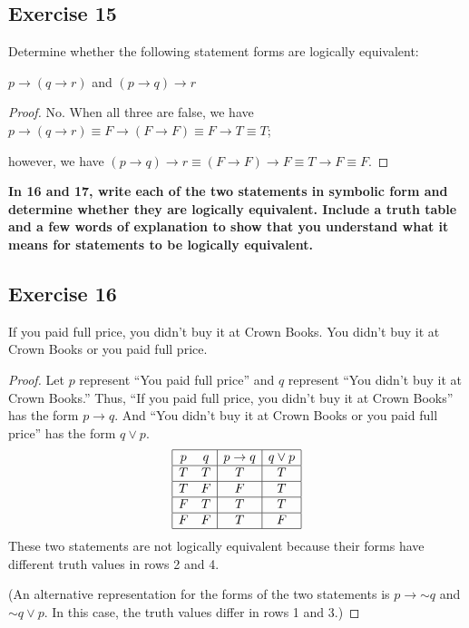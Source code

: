 \documentclass[14pt]{extarticle}
\begin{document}
\subsection{Exercise 15}
Determine whether the following statement forms are logically equivalent:

$p \to (q \to r)$ and $(p \to q) \to r$

\begin{proof}
    No. When all three are false, we have $p \to (q \to r) \equiv F \to (F \to F) \equiv F \to T \equiv T$;

    however, we have $(p \to q) \to r \equiv (F \to F) \to F \equiv T \to F \equiv F$.
\end{proof}

{\bf In 16 and 17, write each of the two statements in symbolic form and determine whether they are logically equivalent. Include a truth table and a few words of explanation to show that you understand what it means for statements to be logically equivalent.}

\subsection{Exercise 16}
If you paid full price, you didn’t buy it at Crown Books. You didn’t buy it at Crown Books or you paid full price.

\begin{proof}
    Let $p$ represent “You paid full price” and $q$ represent “You
    didn’t buy it at Crown Books.” Thus, “If you paid full price, you didn’t buy it at Crown Books” has the form $p \to q$. And “You didn’t buy it at Crown Books or you paid full price” has the form $q \vee p$.
    $$
        \begin{array}{|cc|c|c|}
            \hline
            p & q & p \to q & q \vee p \\
            \hline
            T & T & T       & T        \\
            \hline
            T & F & F       & T        \\
            \hline
            F & T & T       & T        \\
            \hline
            F & F & T       & F        \\
            \hline
        \end{array}
    $$
    These two statements are not logically equivalent because their forms have different truth values in rows 2 and 4.

    (An alternative representation for the forms of the two statements is $p \to {\sim q}$ and ${\sim q} \vee p$. In this case, the truth values differ in rows 1 and 3.)
\end{proof}
\end{document}
